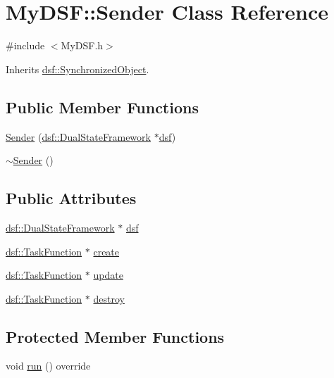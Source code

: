 \hypertarget{class_my_d_s_f_1_1_sender}{}\section{My\+D\+S\+F\+:\+:Sender Class Reference}
\label{class_my_d_s_f_1_1_sender}


{\ttfamily \#include $<$My\+D\+S\+F.\+h$>$}



Inherits \hyperlink{classdsf_1_1_synchronized_object}{dsf\+::\+Synchronized\+Object}.

\subsection*{Public Member Functions}
\begin{DoxyCompactItemize}
\item 
\hyperlink{class_my_d_s_f_1_1_sender_a88b31982fa5ea972cd022f1786ef6ab7}{Sender} (\hyperlink{classdsf_1_1_dual_state_framework}{dsf\+::\+Dual\+State\+Framework} $\ast$\hyperlink{class_my_d_s_f_1_1_sender_a74dc0baa462ddc42b3b032fdf8b5c224}{dsf})
\item 
\hyperlink{class_my_d_s_f_1_1_sender_a2f57637935caf346a15d56a86907caa5}{$\sim$\+Sender} ()
\end{DoxyCompactItemize}
\subsection*{Public Attributes}
\begin{DoxyCompactItemize}
\item 
\hyperlink{classdsf_1_1_dual_state_framework}{dsf\+::\+Dual\+State\+Framework} $\ast$ \hyperlink{class_my_d_s_f_1_1_sender_a74dc0baa462ddc42b3b032fdf8b5c224}{dsf}
\item 
\hyperlink{namespacedsf_aa16e735f29587f4485b56fc46746f7a9}{dsf\+::\+Task\+Function} $\ast$ \hyperlink{class_my_d_s_f_1_1_sender_a44b80ad5f2e1c9b66b2beccdca6f2e9a}{create}
\item 
\hyperlink{namespacedsf_aa16e735f29587f4485b56fc46746f7a9}{dsf\+::\+Task\+Function} $\ast$ \hyperlink{class_my_d_s_f_1_1_sender_a15eb7f6b4e8124216e7fd29369543095}{update}
\item 
\hyperlink{namespacedsf_aa16e735f29587f4485b56fc46746f7a9}{dsf\+::\+Task\+Function} $\ast$ \hyperlink{class_my_d_s_f_1_1_sender_a15d42b9428ac6e290d84937824058bc2}{destroy}
\end{DoxyCompactItemize}
\subsection*{Protected Member Functions}
\begin{DoxyCompactItemize}
\item 
void \hyperlink{class_my_d_s_f_1_1_sender_a0d328bcb8646e429712d2dd62ab9d201}{run} () override
\end{DoxyCompactItemize}
